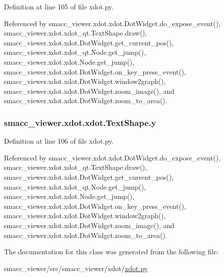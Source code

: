 Definition at line 105 of file xdot.\+py.



Referenced by smacc\+\_\+viewer.\+xdot.\+xdot.\+Dot\+Widget.\+do\+\_\+expose\+\_\+event(), smacc\+\_\+viewer.\+xdot.\+xdot\+\_\+qt.\+Text\+Shape.\+draw(), smacc\+\_\+viewer.\+xdot.\+xdot.\+Dot\+Widget.\+get\+\_\+current\+\_\+pos(), smacc\+\_\+viewer.\+xdot.\+xdot\+\_\+qt.\+Node.\+get\+\_\+jump(), smacc\+\_\+viewer.\+xdot.\+xdot.\+Node.\+get\+\_\+jump(), smacc\+\_\+viewer.\+xdot.\+xdot.\+Dot\+Widget.\+on\+\_\+key\+\_\+press\+\_\+event(), smacc\+\_\+viewer.\+xdot.\+xdot.\+Dot\+Widget.\+window2graph(), smacc\+\_\+viewer.\+xdot.\+xdot.\+Dot\+Widget.\+zoom\+\_\+image(), and smacc\+\_\+viewer.\+xdot.\+xdot.\+Dot\+Widget.\+zoom\+\_\+to\+\_\+area().

\subsubsection[{\texorpdfstring{y}{y}}]{\setlength{\rightskip}{0pt plus 5cm}smacc\+\_\+viewer.\+xdot.\+xdot.\+Text\+Shape.\+y}\hypertarget{classsmacc__viewer_1_1xdot_1_1xdot_1_1TextShape_aeb3fc97ee8f5cdf716d9b02f09e1e2bd}{}\label{classsmacc__viewer_1_1xdot_1_1xdot_1_1TextShape_aeb3fc97ee8f5cdf716d9b02f09e1e2bd}


Definition at line 106 of file xdot.\+py.



Referenced by smacc\+\_\+viewer.\+xdot.\+xdot.\+Dot\+Widget.\+do\+\_\+expose\+\_\+event(), smacc\+\_\+viewer.\+xdot.\+xdot\+\_\+qt.\+Text\+Shape.\+draw(), smacc\+\_\+viewer.\+xdot.\+xdot.\+Dot\+Widget.\+get\+\_\+current\+\_\+pos(), smacc\+\_\+viewer.\+xdot.\+xdot\+\_\+qt.\+Node.\+get\+\_\+jump(), smacc\+\_\+viewer.\+xdot.\+xdot.\+Node.\+get\+\_\+jump(), smacc\+\_\+viewer.\+xdot.\+xdot.\+Dot\+Widget.\+on\+\_\+key\+\_\+press\+\_\+event(), smacc\+\_\+viewer.\+xdot.\+xdot.\+Dot\+Widget.\+window2graph(), smacc\+\_\+viewer.\+xdot.\+xdot.\+Dot\+Widget.\+zoom\+\_\+image(), and smacc\+\_\+viewer.\+xdot.\+xdot.\+Dot\+Widget.\+zoom\+\_\+to\+\_\+area().



The documentation for this class was generated from the following file\+:\begin{DoxyCompactItemize}
\item 
smacc\+\_\+viewer/src/smacc\+\_\+viewer/xdot/\hyperlink{xdot_8py}{xdot.\+py}\end{DoxyCompactItemize}
